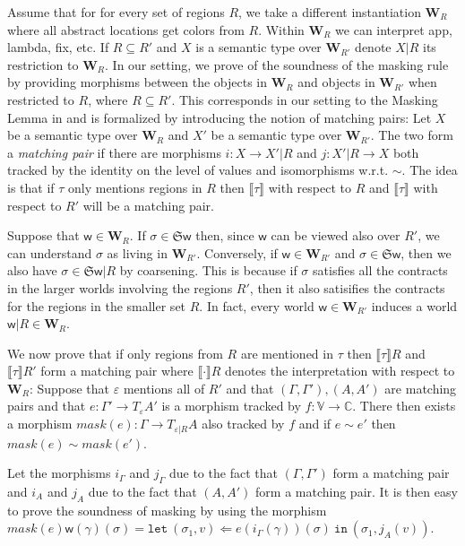 \documentclass[orivec]{llncs}
\newcommand{\keywd}[1]{\mathtt{#1}}
\newcommand{\letin}[2]{\keywd{let}\:{#1}\!\Leftarrow\!{#2}\:\keywd{in}\:}
\newcommand{\eff}{\varepsilon}
\newcommand{\sem}[1]{\ensuremath{\llbracket {#1} \rrbracket}}
\newcommand\w{\ensuremath{\mathsf{w}}\xspace}
\newcommand{\world}{\ensuremath{\mathbf{W}}\xspace}
\newcommand{\Values}{\mathbb{V}}
\newcommand{\Comps}{\mathbb{C}}
\newcommand{\Astores}{\mathfrak{S}}
\begin{document}
Assume that for 
for every set of regions $R$, we take a different instantiation $\world_R$
where all abstract locations get colors from $R$. Within $\world_R$ we can
interpret app, lambda, fix, etc.
If $R\subseteq R'$ and $X$ is a semantic type over $\world_{R'}$ denote $X
| R$ its restriction to $\world_R$. 
In our setting, we prove of the soundness of the
masking rule by providing morphisms between the objects in
$\world_R$ and objects in $\world_{R'}$ when restricted to $R$, where $R
\subseteq R'$. This corresponds in our
setting to the Masking Lemma in \cite{DBLP:conf/ppdp/BentonKBH07} and is
formalized by introducing the notion of matching pairs:
 Let $X$ be a semantic
type over $\world_R$ and $X'$ be a semantic type over
$\world_{R'}$. The two form a \emph{matching pair} if there are morphisms
$i: X \to X'|R$ and $j: X'|R \to X$ both tracked by the identity on the
level of values and isomorphisms w.r.t. $\sim$. The idea is that if $\tau$
only mentions regions in $R$ then $\sem{\tau}$ with respect to $R$ and
$\sem{\tau}$ with respect to $R'$ will be a matching pair.




Suppose that $\w\in \world_R$. 
If $\sigma \in \Astores \w$ then, since $\w$ can be viewed also over $R'$,
we can understand $\sigma$ as living in $\world_{R'}$. Conversely, if $\w
\in \world_{R'}$ and $\sigma\in \Astores \w$, then we also have 
$\sigma \in \Astores \w|R$ by coarsening. This is because if $\sigma$
satisfies all the contracts in the larger worlds involving the regions
$R'$, then it also satisifies the contracts for the regions in the smaller
set $R$. In fact, every world $\w \in \world_{R'}$ induces a world $\w|R
\in \world_{R}$.

We now prove that if only regions from $R$ are mentioned in $\tau$ then
$\sem{\tau}R$ and $\sem{\tau}R'$ form a matching pair where $\sem{\cdot}R$
denotes the interpretation with respect to $\world_R$: Suppose that $\eff$
mentions all of $R'$ and that $(\Gamma,\Gamma'), (A,A')$
are matching pairs and that $e:\Gamma' \to T_\eff A'$ is a morphism tracked
by $f:\Values \to \Comps$. There then exists a morphism $mask(e) : \Gamma
\to T_{\eff|R} A$  also tracked by $f$ and if $e\sim e'$ then $mask(e)
\sim mask(e')$.

Let the morphisms $i_\Gamma$ and $j_\Gamma$ due to the fact that
$(\Gamma, \Gamma')$ form a matching pair and $i_A$ and $j_A$ due to the
fact that $(A, A')$ form a matching pair. It is then easy to prove the
soundness of masking by using the morphism
$mask(e)\w(\gamma)(\sigma) =
\letin{(\sigma_1,v)}{e(i_\Gamma(\gamma))(\sigma)} (\sigma_1, j_A(v))$.
\end{document}
